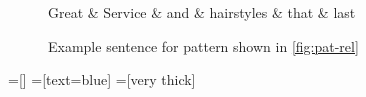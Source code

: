 \documentclass[11pt,a4paper]{article}
\begin{document}
\begin{figure}
    \centering
    \begin{dependency}
    \begin{deptext}[column sep=0.1cm]
    Great \& Service \& and \& hairstyles \& that \& last  \\
    \end{deptext}
    \end{dependency}
    \caption{Example sentence for pattern shown in \cref{fig:pat-rel}}
    \label{fig:aclrecl}
\end{figure}

    

=[] %
=[text=blue]%
=[very thick]
\end{document}
